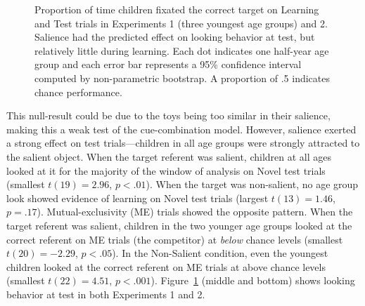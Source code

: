 \documentclass[man,floatsintext]{apa6}
\begin{document}
\begin{figure}[!h]
	\caption{\label{fig:exp1_2} Proportion of time children fixated the correct target on Learning and Test trials in Experiments 1 (three youngest age groups) and 2. Salience had the predicted effect on looking behavior at test, but relatively little during learning. Each dot indicates one half-year age group and each error bar represents a 95\% confidence interval computed by non-parametric bootstrap. A proportion of .5 indicates chance performance.}
\end{figure}

This null-result could be due to the toys being too similar in their salience, making this a weak test of the cue-combination model. However, salience exerted a strong effect on test trials---children in all age groups were strongly attracted to the salient object. When the target referent was salient, children at all ages looked at it for the majority of the window of analysis on Novel test trials (smallest $t(19)  = 2.96$, $p < .01$). When the target was non-salient, no age group look showed evidence of learning on Novel test trials (largest $t(13)  = 1.46$, $p = .17$). Mutual-exclusivity (ME) trials showed the opposite pattern. When the target referent was salient, children in the two younger age groups looked at the correct referent on ME trials (the competitor) at \emph{below} chance levels (smallest $t(20) = -2.29$, $p < .05$). In the Non-Salient condition, even the youngest children looked at the correct referent on ME trials at above chance levels (smallest $t(22) = 4.51$, $p < .001$). Figure~\ref{fig:exp1_2} (middle and bottom) shows looking behavior at test in both Experiments 1 and 2.
\end{document}
